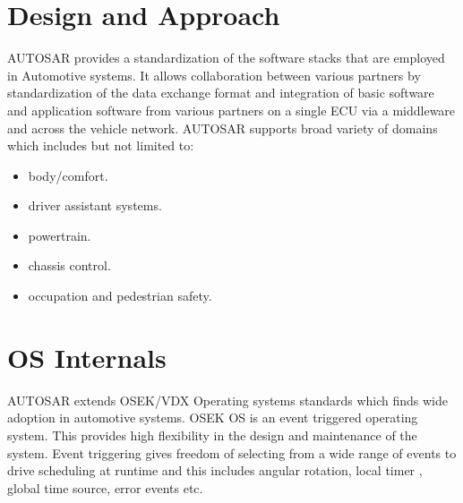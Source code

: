 \section{Design and Approach}

AUTOSAR provides a standardization of the software stacks that are employed in Automotive systems. It allows collaboration between various partners by standardization of the data exchange format and integration of basic software and application software from various partners on a single ECU via a middleware and across the vehicle network.
AUTOSAR supports broad variety of domains which includes but not limited to:
\begin{itemize}
	\item body/comfort.
	\item driver assistant systems.
	\item powertrain.
	\item chassis control.
	\item occupation and pedestrian safety.
\end{itemize}

\section{OS Internals}

AUTOSAR extends OSEK/VDX Operating systems standards which finds wide adoption in automotive systems.
OSEK OS is an event triggered operating system. This provides high flexibility in the design and maintenance of the system. Event triggering gives freedom of selecting from a wide range of events to drive scheduling at runtime and this includes angular rotation, local timer , global time source, error events etc.
